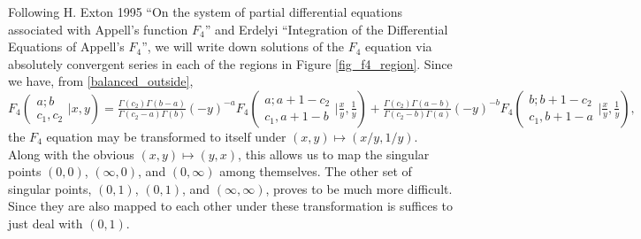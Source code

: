 \documentclass[12pt]{article}
\numberwithin{equation}{section}
\newcommand{\ArgS}[3] {( \begin{smallmatrix} #1 \\ #2 \end{smallmatrix} | {#3})}
\newcommand{\appellFfourS}[6]    {F_4 \ArgS{{#1};{#2}}{{#3},{#4}}{{#5},{#6}}}
\begin{document}
Following H. Exton 1995 ``On the system of partial differential equations associated with Appell's function $F_4$'' and Erdelyi ``Integration of the Differential Equations of Appell's $F_4$'',
we will write down solutions of the $F_4$ equation via absolutely convergent series in each of the regions in Figure \ref{fig_f4_region}. Since we have, from \eqref{balanced_outside},
\begin{equation*}
\appellFfourS{a}{b}{c_1}{c_2}{x}{y}
=\tfrac{\Gamma(c_2)\Gamma(b-a)}{\Gamma(c_2-a)\Gamma(b)} (-y)^{-a} \appellFfourS{a}{a+1-c_2}{c_1}{a+1-b}{\tfrac{x}{y}}{\tfrac{1}{y}}
+\tfrac{\Gamma(c_2)\Gamma(a-b)}{\Gamma(c_2-b)\Gamma(a)} (-y)^{-b} \appellFfourS{b}{b+1-c_2}{c_1}{b+1-a}{\tfrac{x}{y}}{\tfrac{1}{y}}\text{,}
\end{equation*}
the $F_4$ equation may be transformed to itself under $(x,y) \mapsto (x/y,1/y)$. Along with the obvious $(x,y) \mapsto (y,x)$, this allows us to map the singular
points $(0,0)$, $(\infty,0)$, and $(0,\infty)$ among themselves. The other set of singular points, $(0,1)$, $(0,1)$, and $(\infty,\infty)$, proves to be much more difficult.
Since they are also mapped to each other under these transformation is suffices to just deal with $(0,1)$.
\end{document}
